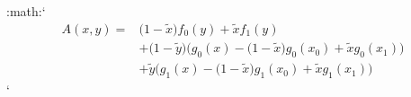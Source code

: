 :math:`\displaystyle \begin{align*}
    A(x,y)=&\big(1-\tilde{x}\big)f_0(y)+\tilde{x}f_1(y) \\
    &+\big(1-\tilde{y}\big)\Big(g_0(x)-\big(1-\tilde{x}\big)g_0(x_0)+\tilde{x}g_0(x_1)\Big) \\
    &+\tilde{y}\Big(g_1(x)-\big(1-\tilde{x}\big)g_1(x_0)+\tilde{x}g_1(x_1)\Big)
    \end{align*}`